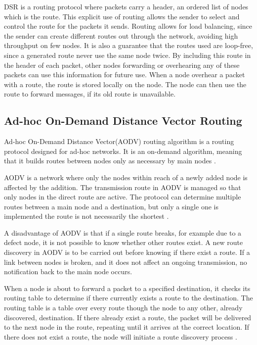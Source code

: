 DSR is a routing protocol where packets carry a header, an ordered list of nodes which is the route.
This explicit use of routing allows the sender to select and control the route for the packets it sends.
Routing allows for load balancing, since the sender can create different routes out through the network, avoiding high throughput on few nodes.
It is also a guarantee that the routes used are loop-free, since a generated route never use the same node twice.
By including this route in the header of each packet, other nodes forwarding or overhearing any of these packets can use this information for future use\cite{DSR}.
When a node overhear a packet with a route, the route is stored locally on the node.
The node can then use the route to forward messages, if its old route is unavailable.

\subsection{Ad-hoc On-Demand Distance Vector Routing}\label{cha:AOVD1}
Ad-hoc On-Demand Distance Vector(AODV) routing algorithm is a routing protocol designed for ad-hoc networks. 
It is an on-demand algorithm, meaning that it builds routes between nodes only as necessary by main nodes \cite{AOVD1}.

AODV is a network where only the nodes within reach of a newly added node is affected by the addition.
The transmission route in AODV is managed so that only nodes in the direct route are active.
The protocol can determine multiple routes between a main node and a destination, but only a single one is implemented the route is not necessarily the shortest \cite{AOVD1}.

A disadvantage of AODV is that if a single route breaks, for example due to a defect node, it is not possible to know whether other routes exist.
A new route discovery in AODV is to be carried out before knowing if there exist a route.
If a link between nodes is broken, and it does not affect an ongoing transmission, no notification back to the main node occurs.

When a node is about to forward a packet to a specified destination, it checks its routing table to determine if there currently exists a route to the destination.
The routing table is a table over every route though the node to any other, already discovered, destination.
If there already exist a route, the packet will be delivered to the next node in the route, repeating until it arrives at the correct location.
If there does not exist a route, the node will initiate a route discovery process \cite{AOVD1}.

